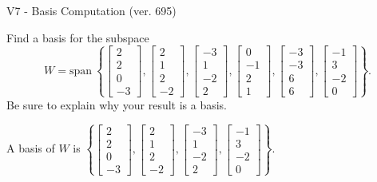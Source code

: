 \begin{exercise}
  \begin{exerciseTitle}V7 - Basis Computation (ver. 695)\end{exerciseTitle}
  \begin{exerciseStatement}
    Find a basis for the subspace 
\[W=\mathrm{span}\ \left\{\left[\begin{array}{r}
2 \\
2 \\
0 \\
-3
\end{array}\right] , \left[\begin{array}{r}
2 \\
1 \\
2 \\
-2
\end{array}\right] , \left[\begin{array}{r}
-3 \\
1 \\
-2 \\
2
\end{array}\right] , \left[\begin{array}{r}
0 \\
-1 \\
2 \\
1
\end{array}\right] , \left[\begin{array}{r}
-3 \\
-3 \\
6 \\
6
\end{array}\right] , \left[\begin{array}{r}
-1 \\
3 \\
-2 \\
0
\end{array}\right]\right\}.\]
 Be sure to explain why your result is a basis.


  \end{exerciseStatement}
  \begin{exerciseAnswer}
   A basis of \(W\) is  \(\left\{\left[\begin{array}{r}
2 \\
2 \\
0 \\
-3
\end{array}\right] , \left[\begin{array}{r}
2 \\
1 \\
2 \\
-2
\end{array}\right] , \left[\begin{array}{r}
-3 \\
1 \\
-2 \\
2
\end{array}\right] , \left[\begin{array}{r}
-1 \\
3 \\
-2 \\
0
\end{array}\right]\right\}\).
  


  \end{exerciseAnswer}
\end{exercise}